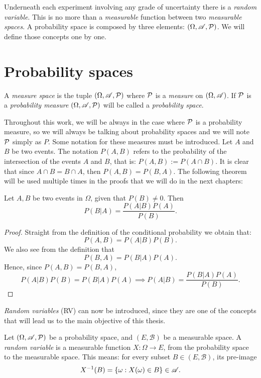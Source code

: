 

Underneath each experiment involving any grade of uncertainty there is a \emph{random variable}. This is no more than a \emph{measurable} function between two \emph{measurable spaces}.
A probability space is composed by three elements: $(\Omega, \mathscr{A}, \mathcal{P})$. We will define those concepts one by one.

\section{Probability spaces}


\begin{ndef}
A \emph{measure space} is the tuple $(\Omega, \mathscr{A},\mathcal{P})$ where $\mathcal{P}$ is a \emph{measure} on $(\Omega, \mathscr{A})$. If $\mathcal{P}$ is a \emph{probability measure} $(\Omega,\mathscr{A},\mathcal{P})$ will be called a \emph{probability space}.
\end{ndef}

Throughout this work, we will be always in the case where $\mathcal{P}$ is a probability measure, so we will always be talking about probability spaces and we will note $\mathcal{P}$ simply as $P$. Some notation for these measures must be introduced. Let $A$ and $B$ be two events.
The notation $P(A,B)$ refers to the probability of the intersection of the events $A$ and $B$, that is: $P(A,B) := P(A\cap B)$.
 It is clear that since $A \cap B = B \cap A$, then $P(A,B) = P(B,A)$. The following theorem will be used multiple times in the proofs that we will do in the next chapters:

\begin{nth}
Let $A,B$ be two events in $\Omega$, given that $P(B) \neq 0$. Then
$$
P(B|A) = \frac{P(A|B) P(A)}{P(B)}.
$$
\end{nth}
\begin{proof}
Straight from the definition of the conditional probability we obtain that:
$$
P(A,B) = P(A|B)P(B).
$$
We also see from the definition that
$$
P(B,A) = P(B|A)P(A).
$$
Hence, since $P(A,B) = P(B,A)$,
$$
P(A|B)P(B) = P(B|A)P(A) \implies P(A|B) = \frac{P(B|A)P(A)}{P(B)}.
$$
\end{proof}

\emph{Random variables} (RV) can now be introduced, since they are one of the concepts that will lead us to the main objective of this thesis.

\begin{ndef}
Let $(\Omega,\mathscr{A},\mathcal{P})$ be a probability space, and $(E,\mathcal B)$ be a measurable space. 
A \emph{random variable} is a measurable function $X: \Omega \to E$, from the probability space to the measurable space. This means: for every subset $B \in (E,\mathcal B)$, its pre-image
$$
X^{-1}(B) = \{\omega : X(\omega) \in B\} \in \mathscr{A} .
$$
\end{ndef}


